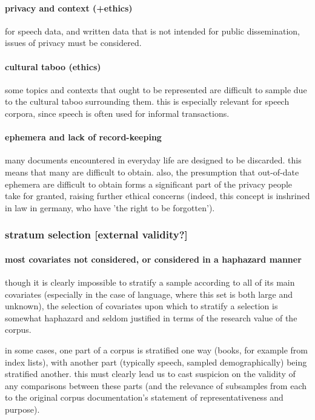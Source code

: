 \paragraph{ privacy and context (+ethics)}
for speech data, and written data that is not intended for public dissemination, issues of privacy must be considered.



\paragraph{ cultural taboo (ethics)}
some topics and contexts that ought to be represented are difficult to sample due to the cultural taboo surrounding them.  this is especially relevant for speech corpora, since speech is often used for informal transactions.


\paragraph{ ephemera and lack of record-keeping}
many documents encountered in everyday life are designed to be discarded.  this means that many are difficult to obtain.  also, the presumption that out-of-date ephemera are difficult to obtain forms a significant part of the privacy people take for granted, raising further ethical concerns (indeed, this concept is inshrined in law in germany, who have 'the right to be forgotten').


\subsubsection{stratum selection [external validity?]}

\paragraph{ most covariates not considered, or considered in a haphazard manner}
though it is clearly impossible to stratify a sample according to all of its main covariates (especially in the case of language, where this set is both large and unknown), the selection of covariates upon which to stratify a selection is somewhat haphazard and seldom justified in terms of the research value of the corpus.

in some cases, one part of a corpus is stratified one way (books, for example from index lists), with another part (typically speech, sampled demographically) being stratified another.  this must clearly lead us to cast suspicion on the validity of any comparisons between these parts (and the relevance of subsamples from each to the original corpus documentation's statement of representativeness and purpose).

